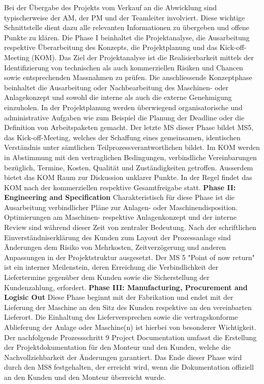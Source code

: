 Bei der Übergabe des Projekts vom Verkauf an die Abwicklung sind typischerweise der AM, der PM und der Teamleiter involviert. Diese wichtige Schnittstelle dient dazu alle relevanten Informationen zu übergeben und offene Punkte zu klären. Die Phase I beinhaltet die Projektanalyse, die Ausarbeitung respektive Überarbeitung des Konzepts, die Projektplanung und das Kick-off-Meeting (KOM). Das Ziel der Projektanalyse ist die Realisierbarkeit mittels der Identifizierung von technischen als auch kommerziellen Risiken und Chancen sowie entsprechenden Massnahmen zu prüfen. Die anschliessende Konzeptphase beinhaltet die Ausarbeitung oder Nachbearbeitung des Maschinen- oder Anlagekonzept und sowohl die interne als auch die externe Genehmigung einzuholen. In der Projektplanung werden überwiegend organisatorische und administrative Aufgaben wie zum Beispiel die Planung der Deadline oder die Definition von Arbeitspaketen gemacht. Der letzte MS dieser Phase bildet MS5, das Kick-off-Meeting, welches der Schaffung eines gemeinsamen, identischen Verständnis unter sämtlichen Teilprozessverantwortlichen bildet. Im KOM werden in Abstimmung mit den vertraglichen Bedingungen, verbindliche Vereinbarungen bezüglich, Termine, Kosten, Qualität und Zuständigkeiten getroffen. Ausserdem bietet das KOM Raum zur Diskussion unklarer Punkte. In der Regel findet das KOM nach der kommerziellen respektive Gesamtfreigabe statt.
\newline
\textbf{Phase II: Engineering and Specification}
\newline
Charakteristisch für diese Phase ist die Ausarbeitung verbindlicher Pläne zur Anlagen- oder Maschinendisposition. Optimierungen am Maschinen- respektive Anlagenkonzept und der interne Review sind während dieser Zeit von zentraler Bedeutung. Nach der schriftlichen Einverständniserklärung des Kunden zum Layout der Prozessanlage sind Änderungen dem Risiko von Mehrkosten, Zeitverzögerung und anderen Anpassungen in der Projektstruktur ausgesetzt. Der MS 5 "Point of now return" ist ein interner Meilenstein, deren Erreichung die Verbindlichkeit der Liefertermine gegenüber dem Kunden sowie die Sicherstellung der Kundenzahlung, erfordert. 
\newline
\textbf{Phase III: Manufacturing, Procurement and Logisic Out}
\newline
Diese Phase beginnt mit der Fabrikation und endet mit der Lieferung der Maschine an den Sitz des Kunden respektive an den vereinbarten Lieferort. Die Einhaltung des Lieferversprechen sowie die vertragskonforme Ablieferung der Anlage oder Maschine(n) ist hierbei von besonderer Wichtigkeit. Der nachfolgende Prozessschritt 9 Project Documentation umfasst die Erstellung der Projektdokumentation für den Monteur und den Kunden, welche die Nachvollziehbarkeit der Änderungen garantiert. Das Ende dieser Phase wird durch den MS8 festgehalten, der erreicht wird, wenn die Dokumentation offiziell an den Kunden und den Monteur überreicht wurde. 
